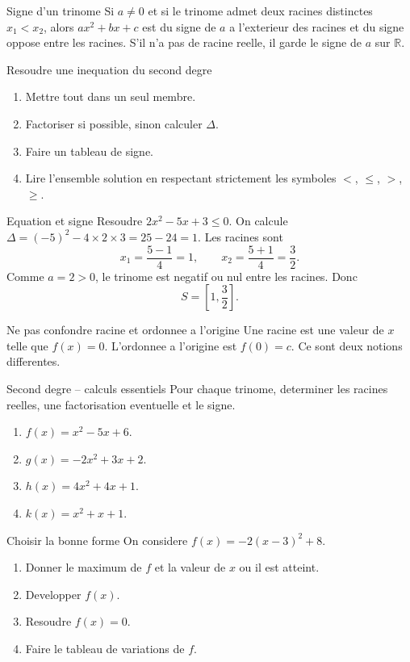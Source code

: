 \documentclass[11pt,a4paper]{article}
\newcommand{\R}{\mathbb{R}}
\begin{document}
\begin{boitecours}{Signe d'un trinome}
Si $a\ne0$ et si le trinome admet deux racines distinctes $x_1<x_2$, alors $ax^2+bx+c$ est du signe de $a$ a l'exterieur des racines et du signe oppose entre les racines. S'il n'a pas de racine reelle, il garde le signe de $a$ sur $\R$.
\end{boitecours}

\begin{boitemethode}{Resoudre une inequation du second degre}
\begin{enumerate}
  \item Mettre tout dans un seul membre.
  \item Factoriser si possible, sinon calculer $\Delta$.
  \item Faire un tableau de signe.
  \item Lire l'ensemble solution en respectant strictement les symboles $<$, $\le$, $>$, $\ge$.
\end{enumerate}
\end{boitemethode}

\begin{boiteexemple}{Equation et signe}
Resoudre $2x^2-5x+3\le0$.
On calcule $\Delta=(-5)^2-4\times2\times3=25-24=1$. Les racines sont
\[
x_1=\frac{5-1}{4}=1,\qquad x_2=\frac{5+1}{4}=\frac32.
\]
Comme $a=2>0$, le trinome est negatif ou nul entre les racines. Donc
\[
S=\left[1,\frac32\right].
\]
\end{boiteexemple}

\begin{boiteattention}{Ne pas confondre racine et ordonnee a l'origine}
Une racine est une valeur de $x$ telle que $f(x)=0$. L'ordonnee a l'origine est $f(0)=c$. Ce sont deux notions differentes.
\end{boiteattention}

\begin{exobox}{Second degre -- calculs essentiels}
Pour chaque trinome, determiner les racines reelles, une factorisation eventuelle et le signe.
\begin{enumerate}
  \item $f(x)=x^2-5x+6$.
  \item $g(x)=-2x^2+3x+2$.
  \item $h(x)=4x^2+4x+1$.
  \item $k(x)=x^2+x+1$.
\end{enumerate}
\end{exobox}

\begin{exobox}{Choisir la bonne forme}
On considere $f(x)=-2(x-3)^2+8$.
\begin{enumerate}
  \item Donner le maximum de $f$ et la valeur de $x$ ou il est atteint.
  \item Developper $f(x)$.
  \item Resoudre $f(x)=0$.
  \item Faire le tableau de variations de $f$.
\end{enumerate}
\end{exobox}
\end{document}
